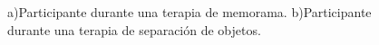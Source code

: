 \begin{figure}[h!]
        \centering
	\caption{a)Participante durante una terapia de memorama. b)Participante durante una terapia de separaci\'on de objetos.}\label{fig:imgtherapies}

\end{figure}

